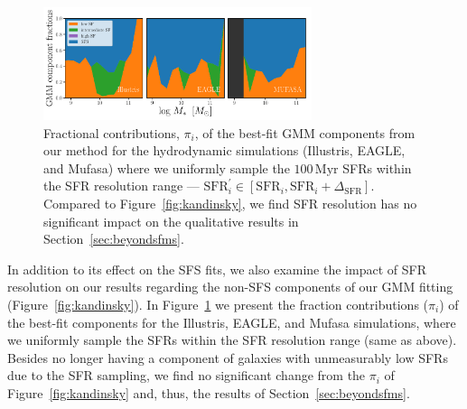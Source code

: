 \documentclass[tighten, preprint]{aastex62}
\begin{document}
\begin{figure}
\begin{center}
\includegraphics[width=0.7\textwidth]{GMMcomp_comp_res_impact.pdf}
\caption{Fractional contributions, $\pi_i$, of the best-fit GMM components 
from our method for the hydrodynamic simulations (Illustris, EAGLE, and 
{\sc Mufasa}) where we uniformly sample the $100\,\mathrm{Myr}$ SFRs within
the SFR resolution range --- $\mathrm{SFR}_i^{\prime} \in [\mathrm{SFR}_i, \mathrm{SFR}_i + 
\Delta_\mathrm{SFR}]$. Compared to Figure~\ref{fig:kandinsky}, we find SFR 
resolution has no significant impact on the qualitative results in Section~\ref{sec:beyondsfms}.} 
\label{fig:mlim_fcomp}
\end{center}
\end{figure}

In addition to its effect on the SFS fits, we also examine the impact of 
SFR resolution on our results regarding the non-SFS components of our GMM 
fitting (Figure~\ref{fig:kandinsky}). In 
Figure~\ref{fig:mlim_fcomp} we present the fraction contributions ($\pi_i$) 
of the best-fit components for the Illustris, EAGLE, and {\sc Mufasa} 
simulations, where we uniformly sample the SFRs within the SFR resolution 
range (same as above). Besides no longer having a component of galaxies 
with unmeasurably low SFRs due to the SFR sampling, we find no significant 
change from the $\pi_i$ of Figure~\ref{fig:kandinsky} and,  thus, the results of Section~\ref{sec:beyondsfms}. 
\end{document}
